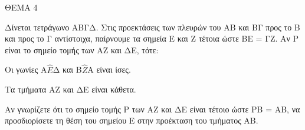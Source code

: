 
ΘΕΜΑ 4

Δίνεται τετράγωνο ΑΒΓΔ. Στις προεκτάσεις των πλευρών του ΑΒ και ΒΓ προς το Β και προς το Γ αντίστοιχα, παίρνουμε τα σημεία Ε και Ζ τέτοια ώστε ΒΕ = ΓΖ. Αν Ρ είναι το σημείο τομής των ΑΖ και ΔΕ, τότε:

\begin{alist}
\item Να αποδείξετε ότι:

.}
\end{alist}
\begin{alist}
\item
  Οι γωνίες Α$\widehat{Ε}$Δ και Β$\widehat{Ζ}$Α είναι ίσες.
\item
  Τα τμήματα ΑΖ και ΔΕ είναι κάθετα.


\item Αν γνωρίζετε ότι το σημείο τομής Ρ των ΑΖ και ΔΕ είναι τέτοιο ώστε ΡΒ = ΑΒ, να προσδιορίσετε τη θέση του σημείου Ε στην προέκταση του τμήματος ΑΒ. 
\end{alist}
